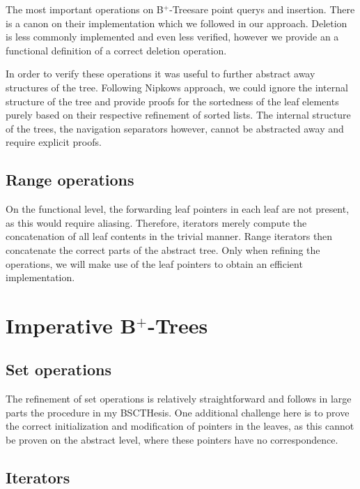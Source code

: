 \documentclass[a4paper,UKenglish,cleveref, autoref, thm-restate]{lipics-v2021}
\newcommand{\btrees}{B$^+$-Trees}
\begin{document}
The most important operations on \btrees are point querys and insertion.
There is a canon on their implementation which we followed in our approach.
Deletion is less commonly implemented and even less verified,
however we provide an a functional definition of a correct deletion operation.

In order to verify these operations it was useful to further
abstract away structures of the tree.
Following Nipkows approach, we could ignore the internal structure of the tree
and provide proofs for the sortedness of the leaf elements purely
based on their respective refinement of sorted lists.
The internal structure of the trees, the navigation separators however,
cannot be abstracted away and require explicit proofs.

\subsection{Range operations}
\label{sec:functional_range}

On the functional level, the forwarding leaf pointers in each leaf
are not present, as this would require aliasing.
Therefore, iterators merely compute the concatenation
of all leaf contents in the trivial manner.
Range iterators then concatenate the correct parts of the
abstract tree.
Only when refining the operations, we will make use of the leaf pointers
to obtain an efficient implementation.


\section{Imperative \btrees}
\label{sec:imperative}

\subsection{Set operations}
\label{sec:imperative_set}

The refinement of set operations is relatively straightforward and
follows in large parts the procedure in my BSCTHesis.
One additional challenge here is to prove the correct initialization
and modification of pointers in the leaves,
as this cannot be proven on the abstract level, where these pointers
have no correspondence.

\subsection{Iterators}
\label{sec:imperative_iter}
\end{document}
